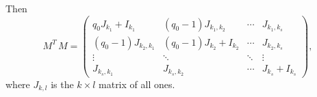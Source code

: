 \documentclass[3p,times,12pt]{article}
\begin{document}

Then $$M^T\,M=\left( \begin{array}{cccc}
    q_0 J_{k_1}+I_{k_1} & (q_0-1)J_{k_1,k_2} & \cdots & J_{k_1,k_s} \\[2mm]
    (q_0-1)J_{k_2,k_1}  & (q_0-1)J_{k_2}+I_{k_2} & \cdots &  J_{k_2,k_s}  \\
    \vdots & \ddots & \ddots & \vdots \\
     J_{k_s,k_1}  & J_{k_s,k_2} & \cdots & J_{k_s}+I_{k_s}
  \end{array}
\right),$$ 
where $J_{k,l}$ is the $k \times l$ matrix of all ones.
\end{document}

